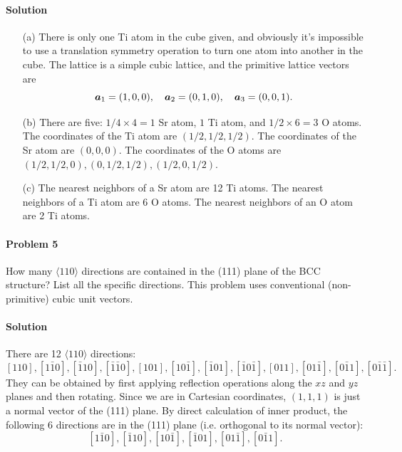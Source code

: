 \documentclass[hyperref, a4paper]{article}
\begin{document}
\paragraph{Solution} \begin{itemize}
\item[(a)] There is only one Ti atom in the cube given, 
and obviously it's impossible to use a translation symmetry operation 
to turn one atom into another in the cube.
The lattice is a simple cubic lattice,
and the primitive lattice vectors are 
\begin{equation}
    \vb*{a}_1 = (1, 0, 0), \quad \vb*{a}_2 = (0, 1, 0), \quad \vb*{a}_3 = (0, 0, 1).
\end{equation}
\item[(b)] There are five: $1/4 \times 4 = 1$ Sr atom, $1$ Ti atom, and 
$1/2 \times 6 = 3$ O atoms.
The coordinates of the Ti atom are $(1/2, 1/2, 1/2)$.
The coordinates of the Sr atom are $(0, 0, 0)$.
The coordinates of the O atoms are $(1/2, 1/2, 0), (0, 1/2, 1/2), (1/2, 0, 1/2)$.
\item[(c)] The nearest neighbors of a Sr atom are 12 Ti atoms.
The nearest neighbors of a Ti atom are 6 O atoms.
The nearest neighbors of an O atom are 2 Ti atoms.
\end{itemize}

\paragraph{Problem 5} How many $\langle 110 \rangle$ directions are contained in the (111) plane of the BCC structure? List all the specific directions. This problem uses conventional (non-primitive) cubic unit vectors.

\paragraph{Solution} There are 12 $\langle 110 \rangle$ directions:
\[
    [110], [1 \bar{1} 0], [\bar{1} 1 0], [\bar{1} \bar{1} 0], 
    [101], [1 0 \bar{1}], [\bar{1} 0 1], [\bar{1} 0 \bar{1}],
    [011], [0 1 \bar{1}], [0 \bar{1} 1], [0 \bar{1} \bar{1}].
\]
They can be obtained by first applying reflection operations along the $xz$ and $yz$ planes
and then rotating.
Since we are in Cartesian coordinates, 
$(1, 1, 1)$ is just a normal vector of the (111) plane.
By direct calculation of inner product, the following 6 directions are in the (111) plane 
(i.e. orthogonal to its normal vector):
\[
    [1 \bar{1} 0], [\bar{1} 1 0], [1 0 \bar{1}], [\bar{1} 0 1], [0 1 \bar{1}], [0 \bar{1} 1].
\]
\end{document}
